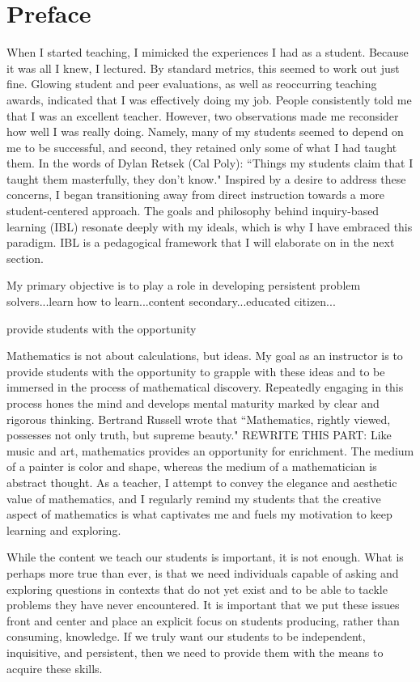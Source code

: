 \chapter*{Preface}


When I started teaching, I mimicked the experiences I had as a student. Because it was all I knew, I lectured. By standard metrics, this seemed to work out just fine. Glowing student and peer evaluations, as well as reoccurring teaching awards, indicated that I was effectively doing my job. People consistently told me that I was an excellent teacher. However, two observations made me reconsider how well I was really doing. Namely, many of my students seemed to depend on me to be successful, and second, they retained only some of what I had taught them. In the words of Dylan Retsek (Cal Poly):
``Things my students claim that I taught them masterfully, they don't know."
Inspired by a desire to address these concerns, I began transitioning away from direct instruction towards a more student-centered approach. The goals and philosophy behind inquiry-based learning (IBL) resonate deeply with my ideals, which is why I have embraced this paradigm. IBL is a pedagogical framework that I will elaborate on in the next section.


My primary objective is to play a role in developing persistent problem solvers...learn how to learn...content secondary...educated citizen...

provide students with the opportunity 


Mathematics is not about calculations, but ideas. My goal as an instructor is to provide students with the opportunity to grapple with these ideas and to be immersed in the process of mathematical discovery. Repeatedly engaging in this process hones the mind and develops mental maturity marked by clear and rigorous thinking. Bertrand Russell wrote that
``Mathematics, rightly viewed, possesses not only truth, but supreme beauty."
REWRITE THIS PART: Like music and art, mathematics provides an opportunity for enrichment. The medium of a painter is color and shape, whereas the medium of a mathematician is abstract thought. As a teacher, I attempt to convey the elegance and aesthetic value of mathematics, and I regularly remind my students that the creative aspect of mathematics is what captivates me and fuels my motivation to keep learning and exploring.

While the content we teach our students is important, it is not enough. What is perhaps more true than ever, is that we need individuals capable of asking and exploring questions in contexts that do not yet exist and to be able to tackle problems they have never encountered. It is important that we put these issues front and center and place an explicit focus on students producing, rather than consuming, knowledge. If we truly want our students to be independent, inquisitive, and persistent, then we need to provide them with the means to acquire these skills.


